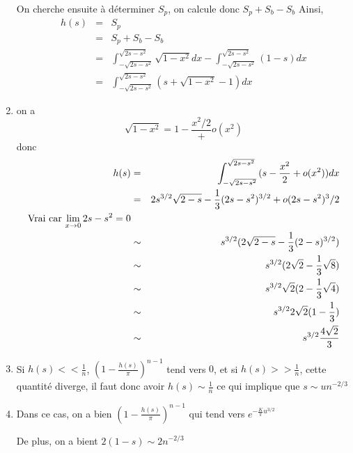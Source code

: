 \documentclass[a4paper,12pt,twoside]{article}
\begin{document}
\begin{enumerate}
			On cherche ensuite à déterminer $S_p$, on calcule donc $S_p + S_b - S_b$
			Ainsi, \begin{eqnarray}
				h(s)	&=& S_p \\
					&=& S_p + S_b - S_b \\
					&=& \int^{\sqrt{2s - s^2}}_{-\sqrt{2s - s^2}}{\sqrt{1-x^2}dx} - \int^{\sqrt{2s - s^2}}_{-\sqrt{2s - s^2}}{(1 - s) dx} \\
					&=& \int^{\sqrt{2s - s^2}}_{-\sqrt{2s - s^2}}{(s + \sqrt{1-x^2} - 1) dx}
			\end{eqnarray}

		\item on a $$\sqrt{1 - x^2} = 1 - \frac{x^2/2} + o(x^2)$$
		donc
		\begin{eqnarray}
			h(s)	&=& \int^{\sqrt{2s - s^2}}_{-\sqrt{2s - s^2}}{(s - \frac{x^2}{2} + o(x^2)) dx} \\
				&=& 2s^{3/2}\sqrt{2-s} - \frac{1}{3}(2s - s^2)^{3/2} + o(2s-s^2)^3/2 \\\text{Vrai car $ \lim_{x \to 0} 2s - s^2 = 0$}\\ %
				&\sim& s^{3/2} (2\sqrt{2-s} - \frac{1}{3}(2 - s)^{3/2}) \\
				&\sim& s^{3/2} (2\sqrt{2} - \frac{1}{3}\sqrt{8}) \\
				&\sim& s^{3/2} \sqrt{2}(2 - \frac{1}{3}\sqrt{4}) \\
				&\sim& s^{3/2} 2\sqrt{2}(1 - \frac{1}{3}) \\
				&\sim& s^{3/2} \frac{4\sqrt{2}}{3} \\
		\end{eqnarray}
		\item	Si $h(s) << \frac{1}{n}$, $\left(1 - \frac{h(s)}{\pi}\right)^{n-1}$ tend vers $0$, et si $h(s) >> \frac{1}{n}$, cette quantité diverge, il faut donc avoir $h(s) \sim \frac{1}{n}$ ce qui implique que $s \sim un^{-2/3}$%

		\item Dans ce cas, on a bien $\left(1 - \frac{h(s)}{\pi}\right)^{n-1}$ qui tend vers $e^{-\frac{K}{\pi}u^{3/2}}$

		De plus, on a bient $2(1-s) \sim 2n^{-2/3}$

		\end{enumerate}
\end{document}
